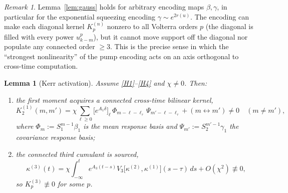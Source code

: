 \documentclass[11pt]{article}
\newtheorem{lemma}{Lemma}
\theoremstyle{remark}
\newtheorem{remark}{Remark}
\begin{document}
\begin{remark}\label{rem:encoding}
Lemma~\ref{lem:gauss} holds for arbitrary encoding maps $\beta,\gamma$, in
particular for the exponential squeezing encoding $\gamma\sim e^{2r(u)}$. The
encoding can make each diagonal kernel $K^{(n)}_p$ nonzero to all Volterra orders
$p$ (the diagonal is filled with every power $u^p_{k-m}$), but it cannot move
support off the diagonal nor populate any connected order $\ge3$. This is the
precise sense in which the ``strongest nonlinearity'' of the pump encoding acts on
an axis orthogonal to cross-time computation.
\end{remark}

\begin{lemma}[Kerr activation]\label{lem:kerr}
Assume \ref{H1}--\ref{H4} and $\chi\neq0$. Then:
\begin{enumerate}[label=(\alph*)]
\item the first moment acquires a connected cross-time bilinear kernel,
\[
K^{(1)}_2(m,m') = \chi\sum_{\ell\ge0}\big[e^{A_1\delta}\big]_\ell\,
\Phi_{m-\ell-\ell_\tau}\,\Psi_{m'-\ell-\ell_\tau} + (m\leftrightarrow m')\neq0
\quad (m\neq m'),
\]
where $\Phi_m:=S_1^{m-1}\beta_1$ is the mean response basis and
$\Psi_{m'}:=S_2^{m'-1}\gamma_1$ the covariance response basis;
\item the connected third cumulant is sourced,
\[
\kappa^{(3)}(t) = \chi\int_{-\infty}^t e^{A_3(t-s)}
V_3\!\big[\kappa^{(2)},\kappa^{(1)}\big](s-\tau)\,ds + O(\chi^2)\not\equiv0,
\]
so $K^{(3)}_p\not\equiv0$ for some $p$.
\end{enumerate}
\end{lemma}
\end{document}
